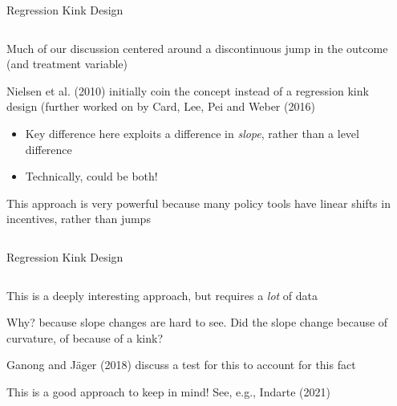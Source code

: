 \documentclass[notes,11pt, aspectratio=169]{beamer}
\newenvironment{wideitemize}{\itemize\addtolength{\itemsep}{10pt}}{\enditemize}
\begin{document}
\begin{frame}{Regression Kink Design}
    \begin{columns}[onlytextwidth, T] %
      \begin{column}{.6\textwidth}
        \begin{wideitemize}
        \item Much of our discussion centered around a discontinuous
          jump in the outcome (and treatment variable)
        \item Nielsen et al. (2010) initially coin the concept instead
          of a regression kink design (further worked on by Card, Lee,
          Pei and Weber (2016)
          \begin{itemize}
          \item Key difference here exploits a difference in
            \emph{slope}, rather than a level difference
          \item Technically, could be both!
          \end{itemize}
        \item This approach is very powerful because many policy tools
          have linear shifts in incentives, rather than jumps
        \end{wideitemize}
      \end{column}%
      \hfill%
      \begin{column}{.4\textwidth}
      \end{column}%
    \end{columns}  
\end{frame}


\begin{frame}{Regression Kink Design}
    \begin{columns}[onlytextwidth, T] %
      \begin{column}{.6\textwidth}
        \begin{wideitemize}
        \item This is a deeply interesting approach, but requires a \emph{lot} of data
        \item Why? because slope changes are hard to see. Did the
          slope change because of curvature, of because of a kink?
        \item Ganong and J\"ager (2018) discuss a test for this to
          account for this fact
        \item This is a good approach to keep in mind! See, e.g.,
          Indarte (2021)
        \end{wideitemize}
      \end{column}%
      \hfill%
      \begin{column}{.4\textwidth}
      \end{column}%
    \end{columns}  
\end{frame}
\end{document}
